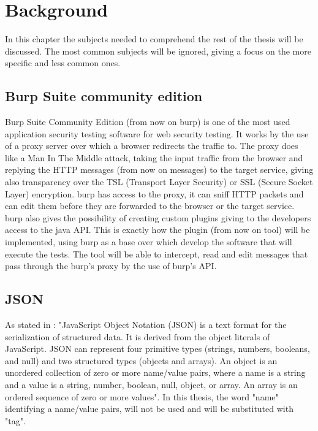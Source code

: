 \chapter{Background}
\label{chap:Background}
In this chapter the subjects needed to comprehend the rest of the thesis will be discussed. The most common subjects will be ignored, giving a focus on the more specific and less common ones.

\section{Burp Suite community edition}
Burp Suite Community Edition (from now on \Gls{burp}) is one of the most used application security testing software for web security testing. It works by the use of a proxy server over which a browser redirects the traffic to. The proxy does like a Man In The Middle attack, taking the input traffic from the browser and replying the HTTP messages (from now on messages) to the target service, giving also transparency over the TSL (Transport Layer Security) or SSL (Secure Socket Layer) encryption. \Gls{burp} has access to the proxy, it can sniff HTTP packets and can edit them before they are forwarded to the browser or the target service. \Gls{burp} also gives the possibility of creating custom plugins giving to the developers access to the java API. This is exactly how the plugin (from now on tool) will be implemented, using \Gls{burp} as a base over which develop the software that will execute the tests. The tool will be able to intercept, read and edit messages that pass through the \Gls{burp}'s proxy by the use of \Gls{burp}'s API.

\section{JSON}
As stated in \cite{json_standard}: "JavaScript Object Notation (JSON) is a text format for the serialization of structured data.  It is derived from the object literals of JavaScript. JSON can represent four primitive types (strings, numbers, booleans, and null) and two structured types (objects and arrays). An object is an unordered collection of zero or more name/value pairs, where a name is a string and a value is a string, number, boolean, null, object, or array. An array is an ordered sequence of zero or more values".
In this thesis, the word "name" identifying a name/value pairs, will not be used and will be substituted with "tag".


